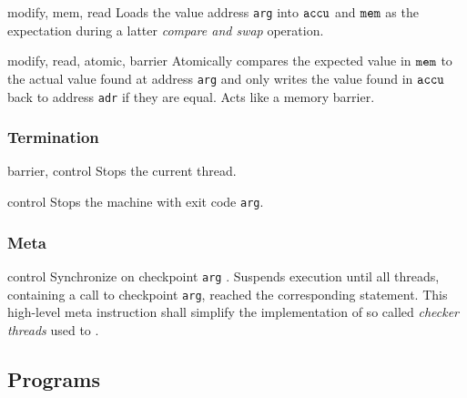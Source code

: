 {}

{}
{modify, mem, read}
{Loads the value  address \texttt{arg} into $\texttt{accu}$ and $\texttt{mem}$ as the expectation during a latter \emph{compare and swap} operation.}

{}
{modify, read, atomic, barrier}
{Atomically compares the expected value in $\texttt{mem}$ to the actual value found at address \texttt{arg} and only writes the value found in $\texttt{accu}$ back to address \texttt{adr} if they are equal.
Acts like a memory barrier.
}

\subsubsection*{Termination}


{}
{barrier, control}
{Stops the current thread.}

{}
{control}
{Stops the machine with exit code \texttt{arg}.}

\subsubsection*{Meta}

{}
{control}
{Synchronize on checkpoint \texttt{arg} .
Suspends execution until all threads, containing a call to checkpoint \texttt{arg}, reached the corresponding  statement.
This high-level meta instruction
shall simplify the implementation of so called \emph{checker threads} used to
.
}

\newpage

\subsection{Programs}

